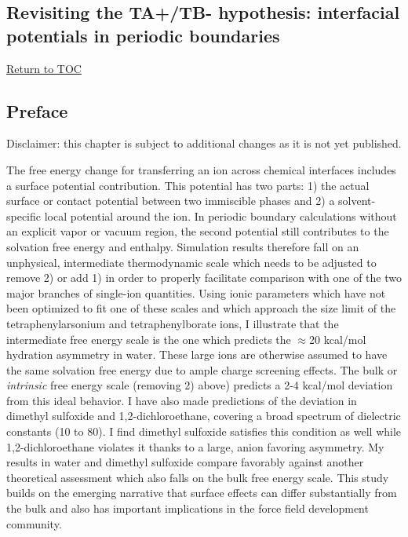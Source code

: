 \begin{tatb}
 \chapter{Revisiting the TA+/TB- hypothesis: interfacial potentials in periodic boundaries~}
 \hyperlink{toc}{Return to TOC}
  \section{\label{ch6:sec0:level1}Preface~}
  
   Disclaimer: this chapter is subject to additional changes as it is not yet published.
  
   The free energy change for transferring an ion across chemical interfaces includes a surface potential contribution. This potential has two parts: 1) the actual 
   surface or contact potential between two immiscible phases and 2) a solvent-specific local potential around the ion. In periodic boundary calculations without 
   an explicit vapor or vacuum region, the second potential still contributes to the solvation free energy and enthalpy. Simulation results therefore fall on an 
   unphysical, intermediate thermodynamic scale which needs to be adjusted to remove 2) or add 1) in order to properly facilitate comparison with one of the two
   major branches of single-ion quantities. Using ionic parameters which have not been optimized to fit one of these scales and which approach the size limit of the 
   tetraphenylarsonium and tetraphenylborate ions, I illustrate that the intermediate free energy scale is the one which predicts the $\approx$20 kcal/mol hydration
   asymmetry in water\cite{wipff1999tatb,wipff2000tatb,wipff2001tatb}. These large ions are otherwise assumed to have the same solvation free energy due to ample 
   charge screening effects\cite{marcus1987tatb}. The bulk or \emph{intrinsic} free energy scale (removing 2) above) predicts a 2-4 kcal/mol deviation from this 
   ideal behavior. I have also made predictions of the deviation in dimethyl sulfoxide and 1,2-dichloroethane, covering a broad spectrum of dielectric constants
   (10 to 80). I find dimethyl sulfoxide satisfies this condition as well while 1,2-dichloroethane violates it thanks to a large, anion favoring asymmetry. My 
   results in water and dimethyl sulfoxide compare favorably against another theoretical assessment which also falls on the bulk free energy scale\cite{pliego2015ccqct}. 
   This study builds on the emerging narrative that surface effects can differ substantially from the bulk and also has important implications in the force field 
   development community.
   

\end{tatb}
